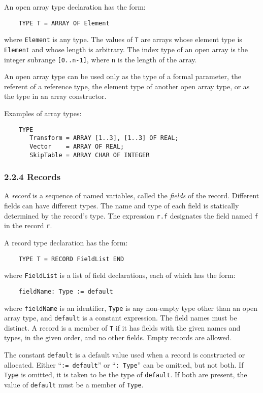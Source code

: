 \documentclass[10pt]{article}
\begin{document}
An open array type declaration has the form:
\begin{verbatim}
    TYPE T = ARRAY OF Element
\end{verbatim}
where \verb|Element| is any type.  The values of \verb|T| are arrays whose
element type is \verb|Element| and whose length is arbitrary.  The index type
of an open array is the integer subrange \verb|[0..n-1]|, where \verb|n| is
the length of the array.

An open array type can be used only as the type of a formal parameter, the
referent of a reference type, the element type of another open array type, or
as the type in an array constructor.

Examples of array types:
\begin{verbatim}
    TYPE
       Transform = ARRAY [1..3], [1..3] OF REAL;
       Vector    = ARRAY OF REAL;
       SkipTable = ARRAY CHAR OF INTEGER
\end{verbatim}

\subsubsection*{2.2.4 Records}

A \emph{record} is a sequence of named variables, called the \emph{fields} of
the record.  Different fields can have different types.  The name and type of
each field is statically determined by the record's type.  The expression
\verb|r.f| designates the field named \verb|f| in the record \verb|r|.

A record type declaration has the form:
\begin{verbatim}
    TYPE T = RECORD FieldList END
\end{verbatim}
where \verb|FieldList| is a list of field declarations, each of which has the
form:
\begin{verbatim}
    fieldName: Type := default
\end{verbatim}
where \verb|fieldName| is an identifier, \verb|Type| is any non-empty type
other than an open array type, and \verb|default| is a constant expression.
The field names must be distinct.  A record is a member of \verb|T| if it has
fields with the given names and types, in the given order, and no other
fields.  Empty records are allowed.

The constant \verb|default| is a default value used when a record is
constructed or allocated.  Either ``\verb|:= default|'' or ``\verb|: Type|''
can be omitted, but not both.  If \verb|Type| is omitted, it is taken to be
the type of \verb|default|.  If both are present, the value of \verb|default|
must be a member of \verb|Type|.
\end{document}
